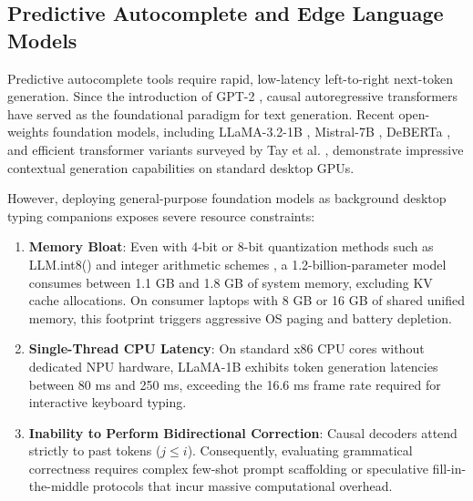 \documentclass[10pt,journal,compsoc]{IEEEtran}
\begin{document}
\subsection{Predictive Autocomplete and Edge Language Models}
Predictive autocomplete tools require rapid, low-latency left-to-right next-token generation. Since the introduction of GPT-2 \cite{radford2019language}, causal autoregressive transformers have served as the foundational paradigm for text generation. Recent open-weights foundation models, including LLaMA-3.2-1B \cite{touvron2023llama}, Mistral-7B \cite{jiang2023mistral}, DeBERTa \cite{he2020deberta}, and efficient transformer variants surveyed by Tay et al. \cite{tay2022efficient}, demonstrate impressive contextual generation capabilities on standard desktop GPUs. 

However, deploying general-purpose foundation models as background desktop typing companions exposes severe resource constraints:
\begin{enumerate}
    \item \textbf{Memory Bloat}: Even with 4-bit or 8-bit quantization methods such as LLM.int8() \cite{dettmers2022llmint8} and integer arithmetic schemes \cite{jacob2018quantization}, a 1.2-billion-parameter model consumes between 1.1 GB and 1.8 GB of system memory, excluding KV cache allocations. On consumer laptops with 8 GB or 16 GB of shared unified memory, this footprint triggers aggressive OS paging and battery depletion.
    \item \textbf{Single-Thread CPU Latency}: On standard x86 CPU cores without dedicated NPU hardware, LLaMA-1B exhibits token generation latencies between 80 ms and 250 ms, exceeding the 16.6 ms frame rate required for interactive keyboard typing.
    \item \textbf{Inability to Perform Bidirectional Correction}: Causal decoders attend strictly to past tokens ($j \le i$). Consequently, evaluating grammatical correctness requires complex few-shot prompt scaffolding or speculative fill-in-the-middle protocols that incur massive computational overhead.
\end{enumerate}
\end{document}
